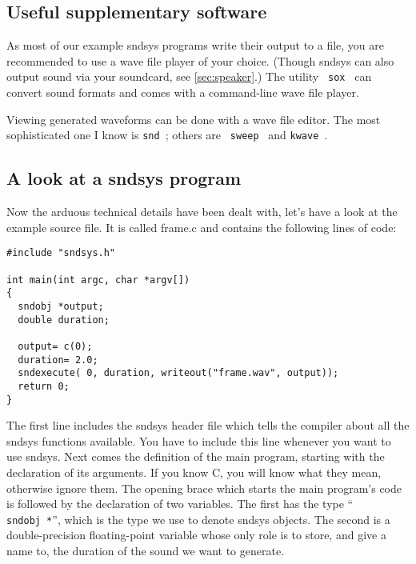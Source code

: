 \documentclass{article}
\def\s{{\sc sndsys} }
\def\sn{{\sc sndsys}}
\def\bv{\begin{verbatim}}
\begin{document}
\subsection{Useful supplementary software}

As most of our example \s programs write their output to a file, you are
recommended to use a wave file player of your choice.  (Though an also
output sound via your soundcard, see \autoref{sec:speaker}.)  The utility {\tt
sox}~\cite{sox} can convert sound formats and comes with a command-line wave
file player.

Viewing generated waveforms can be done with a wave file editor.  The most
sophisticated one I know is {\tt snd}~\cite{snd}; others are {\tt
sweep}~\cite{swe} and {\tt kwave}~\cite{kwa}.


\subsection{A look at a \s program}
\label{sec:lookat}

Now the arduous technical details have been dealt with, let's have a look at
the example source file.  It is called frame.c and contains the following lines
of code:

\bv
#include "sndsys.h"

int main(int argc, char *argv[])
{
  sndobj *output;
  double duration;
  
  output= c(0);
  duration= 2.0;
  sndexecute( 0, duration, writeout("frame.wav", output));
  return 0;
}
\end{verbatim}

The first line includes the \s header file which tells the compiler about all
the \s functions available.  You have to include this line whenever you want to
use \sn.   Next comes the definition of the main program, starting with the
declaration of its arguments.  If you know C, you will know what they mean,
otherwise ignore them.  The opening brace which starts the main program's code
is followed by the declaration of two variables.  The first has the type ``{\tt
sndobj~*}'', which is the type we use to denote \s objects.  The second is a
double-precision floating-point variable whose only role is to store, and give
a name to, the duration of the sound we want to generate.
\end{document}
